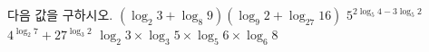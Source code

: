 다음 값을 구하시오.
 $(\log_2 3+\log_8 9)(\log_9 2+\log_{27} 16)$
 $5^{2\log_5 4-3\log_5 2}$
 $4^{\log_2 7}+27^{\log_3 2}$
 $\log_2 3\times\log_3 5\times\log_5 6\times\log_6 8$
